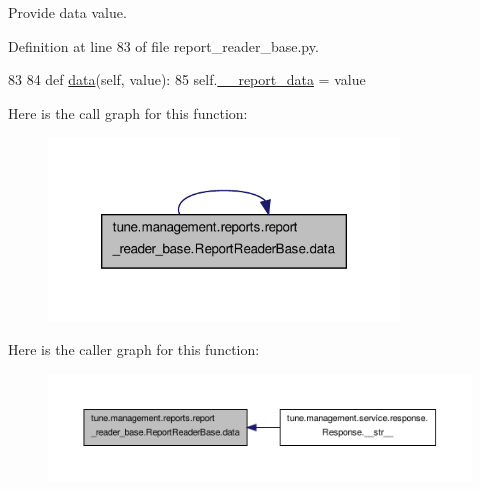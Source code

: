Provide data value. 



Definition at line 83 of file report\-\_\-reader\-\_\-base.\-py.


\begin{DoxyCode}
83 
84     \textcolor{keyword}{def }\hyperlink{classtune_1_1management_1_1reports_1_1report__reader__base_1_1ReportReaderBase_a5c606aca915fa4590882722175756683}{data}(self, value):
85         self.\hyperlink{classtune_1_1management_1_1reports_1_1report__reader__base_1_1ReportReaderBase_a7f0df9aaf6dce143084db4849cbc1d12}{\_\_report\_data} = value

\end{DoxyCode}


Here is the call graph for this function\-:
\nopagebreak
\begin{figure}[H]
\begin{center}
\leavevmode
\includegraphics[width=264pt]{classtune_1_1management_1_1reports_1_1report__reader__base_1_1ReportReaderBase_a5c606aca915fa4590882722175756683_cgraph}
\end{center}
\end{figure}




Here is the caller graph for this function\-:
\nopagebreak
\begin{figure}[H]
\begin{center}
\leavevmode
\includegraphics[width=350pt]{classtune_1_1management_1_1reports_1_1report__reader__base_1_1ReportReaderBase_a5c606aca915fa4590882722175756683_icgraph}
\end{center}
\end{figure}


